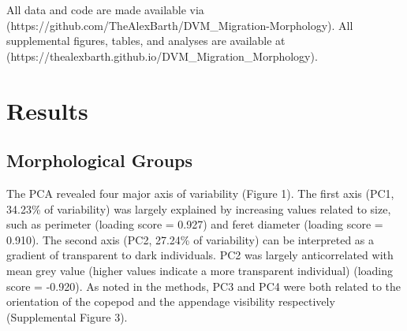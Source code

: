 \documentclass[
  letterpaper,
  DIV=11,
  numbers=noendperiod]{scrartcl}
\begin{document}
All data and code are made available via
(https://github.com/TheAlexBarth/DVM\_Migration-Morphology). All
supplemental figures, tables, and analyses are available at
(https://thealexbarth.github.io/DVM\_Migration\_Morphology).

\hypertarget{results}{%
\section{Results}\label{results}}

\hypertarget{morphological-groups}{%
\subsection{Morphological Groups}\label{morphological-groups}}

The PCA revealed four major axis of variability (Figure 1). The first
axis (PC1, 34.23\% of variability) was largely explained by increasing
values related to size, such as perimeter (loading score = 0.927) and
feret diameter (loading score = 0.910). The second axis (PC2, 27.24\% of
variability) can be interpreted as a gradient of transparent to dark
individuals. PC2 was largely anticorrelated with mean grey value (higher
values indicate a more transparent individual) (loading score = -0.920).
As noted in the methods, PC3 and PC4 were both related to the
orientation of the copepod and the appendage visibility respectively
(Supplemental Figure 3).
\end{document}

